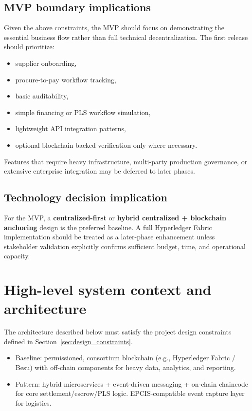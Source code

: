 \documentclass[11pt,a4paper]{article}
\begin{document}
\subsection{MVP boundary implications}
Given the above constraints, the MVP should focus on demonstrating the essential business flow rather than full technical decentralization. The first release should prioritize:
\begin{itemize}
\item supplier onboarding,
\item procure-to-pay workflow tracking,
\item basic auditability,
\item simple financing or PLS workflow simulation,
\item lightweight API integration patterns,
\item optional blockchain-backed verification only where necessary.
\end{itemize}

Features that require heavy infrastructure, multi-party production governance, or extensive enterprise integration may be deferred to later phases.

\subsection{Technology decision implication}
For the MVP, a \textbf{centralized-first} or \textbf{hybrid centralized + blockchain anchoring} design is the preferred baseline. A full Hyperledger Fabric implementation should be treated as a later-phase enhancement unless stakeholder validation explicitly confirms sufficient budget, time, and operational capacity.

\section{High-level system context and architecture}
The architecture described below must satisfy the project design constraints defined in Section~\ref{sec:design_constraints}.
\begin{itemize}
\item Baseline: permissioned, consortium blockchain (e.g., Hyperledger Fabric / Besu) with off-chain components for heavy data, analytics, and reporting.
\item Pattern: hybrid microservices + event-driven messaging + on-chain chaincode for core settlement/escrow/PLS logic. EPCIS-compatible event capture layer for logistics.
\end{itemize}
\end{document}

